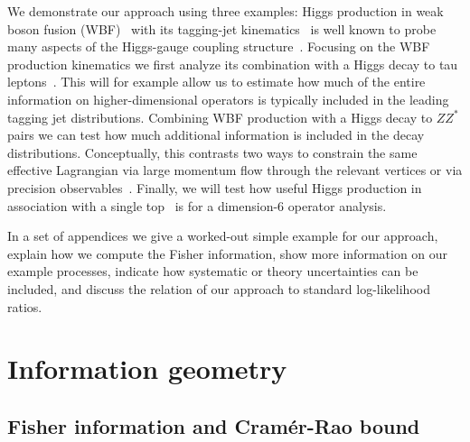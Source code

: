 We demonstrate our approach using three examples: Higgs production in
weak boson fusion (WBF)~\cite{dave_thesis} with its tagging-jet
kinematics~\cite{tagging} is well known to probe many aspects of the
Higgs-gauge coupling structure~\cite{phi_jj}. Focusing on the WBF
production kinematics we first analyze its combination with a Higgs
decay to tau leptons~\cite{wbf_tau}. This will for example allow us to
estimate how much of the entire information on higher-dimensional
operators is typically included in the leading tagging jet
distributions. Combining WBF production with a Higgs decay to $ZZ^*$
pairs we can test how much additional information is included in the
decay distributions. Conceptually, this contrasts two ways to
constrain the same effective Lagrangian via large momentum flow
through the relevant vertices or via precision observables~\cite{higgs_fit}.
Finally, we will test how useful Higgs production in association with
a single top~\cite{top_higgs} is for a dimension-6 operator analysis.

In a set of appendices we give a worked-out simple example for our
approach, explain how we compute the Fisher information, show more
information on our example processes, indicate how systematic or
theory uncertainties can be included, and discuss the relation of our
approach to standard log-likelihood ratios.



\section{Information geometry}
\label{sec:information_formalism}

\subsection{Fisher information and Cram\'er-Rao bound}
\label{sec:information_formalism_information}


